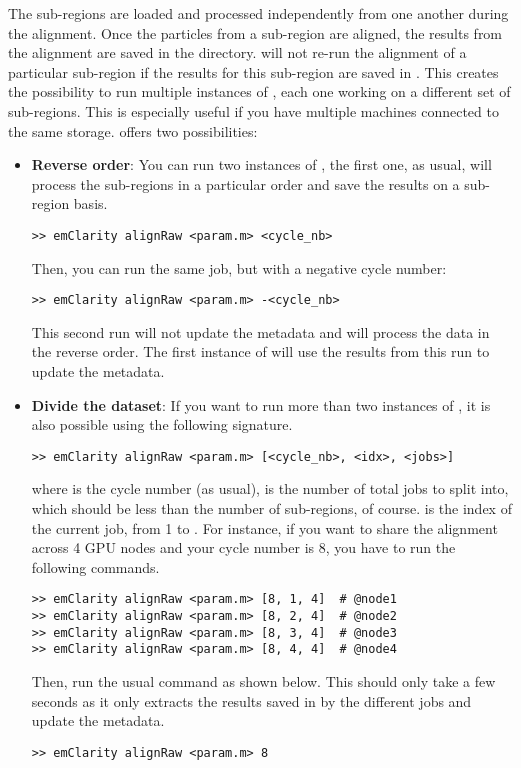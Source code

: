 The sub-regions are loaded and processed independently from one another during the alignment. Once the particles from a sub-region are aligned, the results from the alignment are saved in the  directory. {\emClarity} will not re-run the alignment of a particular sub-region if the results for this sub-region are saved in . This creates the possibility to run multiple instances of {\emClarity}, each one working on a different set of sub-regions. This is especially useful if you have multiple machines connected to the same storage. {\emClarity} offers two possibilities:
\begin{itemize}
    \item \textbf{Reverse order}: You can run two instances of {\emClarity}, the first one, as usual, will process the sub-regions in a particular order and save the results on a sub-region basis.
\begin{lstlisting}
>> emClarity alignRaw <param.m> <cycle_nb>
\end{lstlisting}
    Then, you can run the same job, but with a negative cycle number:
\begin{lstlisting}
>> emClarity alignRaw <param.m> -<cycle_nb>
\end{lstlisting}
    This second run will not update the metadata and will process the data in the reverse order. The first instance of {\emClarity} will use the results from this run to update the metadata.
    
    \item \textbf{Divide the dataset}: If you want to run more than two instances of {\emClarity}, it is also possible using the following signature.
\begin{lstlisting}
>> emClarity alignRaw <param.m> [<cycle_nb>, <idx>, <jobs>]
\end{lstlisting}
    where  is the cycle number (as usual),  is the number of total jobs to split into, which should be less than the number of sub-regions, of course.  is the index of the current job, from 1 to . For instance, if you want to share the alignment across 4 GPU nodes and your cycle number is 8, you have to run the following commands.
\begin{lstlisting}
>> emClarity alignRaw <param.m> [8, 1, 4]  # @node1
>> emClarity alignRaw <param.m> [8, 2, 4]  # @node2
>> emClarity alignRaw <param.m> [8, 3, 4]  # @node3
>> emClarity alignRaw <param.m> [8, 4, 4]  # @node4
\end{lstlisting}
    Then, run the usual command as shown below. This should only take a few seconds as it only extracts the results saved in  by the different jobs and update the metadata.
\begin{lstlisting}
>> emClarity alignRaw <param.m> 8
\end{lstlisting}
    
\end{itemize}


